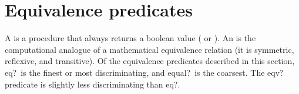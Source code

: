\section{Equivalence predicates}
\label{equivalencesection}

A  is a procedure that always returns a boolean
value (\schtrue{} or \schfalse).  An  is
the computational analogue of a mathematical equivalence relation (it is
symmetric, reflexive, and transitive).  Of the equivalence predicates
described in this section, {\cf eq?}\ is the finest or most
discriminating, and {\cf equal?}\ is the coarsest.  The {\cf eqv?} predicate is
slightly less discriminating than {\cf eq?}.  


